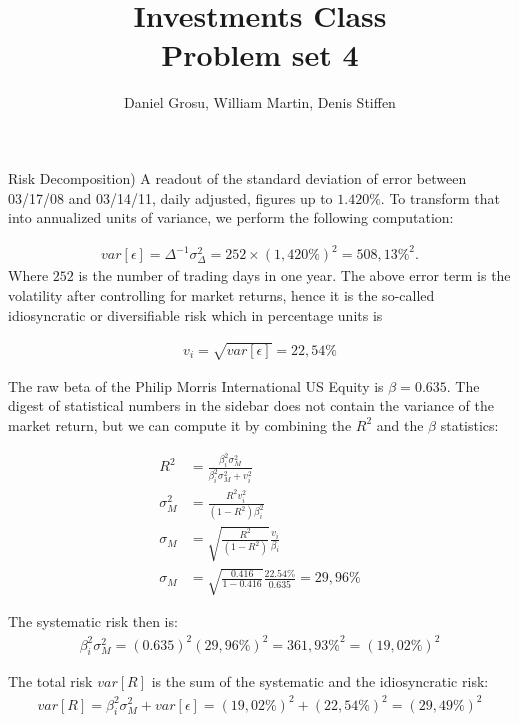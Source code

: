 \documentclass[10pt]{article}
\newenvironment{exercise}[2][Exercise]{\begin{trivlist}
  \item[\hskip \labelsep {\bfseries #1}\hskip \labelsep {\bfseries #2.}]}{\end{trivlist}}
\begin{document}
	
  \renewcommand{\qedsymbol}{\smiley}
	\title{Investments Class \\ Problem set 4}
	\author{Daniel Grosu, William Martin, Denis Stiffen}
	
	\maketitle

\begin{exercise}{1}(Risk Decomposition)
      A readout of the standard deviation of error between
      \textrm{03/17/08} and \textrm{03/14/11}, daily adjusted, figures up to
      $1.420\%$. To transform that into annualized units of variance, we perform
      the following computation:

      \begin{align*}
        var\left[ \epsilon \right] = \Delta^{-1} \sigma_{\Delta}^2 = 252 \times (1,420 \%)^2 = 508,13 \%^2.
      \end{align*}
      Where $252$ is the number of trading days in one year.
      The above error term is the volatility after controlling for market
      returns, hence it is the so-called idiosyncratic or diversifiable risk
      which in percentage units is

      \begin{align*}
        v_i = \sqrt{var\left[ \epsilon \right]} = 22,54 \%
      \end{align*}

      The raw beta of the Philip Morris International US Equity is $\beta =
      0.635$. The digest of statistical numbers in the sidebar does not contain
      the variance of the market return, but we can compute it by combining the
      $R^2$ and the $\beta$ statistics:

      \begin{align*}
        R^2 &= \frac{\beta_i^2 \sigma_M^2}{\beta_i^2 \sigma_M^2 + v_i^2} \\
        \sigma_M^2 &= \frac{R^2 v_i^2}{(1 - R^2) \beta_i^2} \\
        \sigma_M &= \sqrt{\frac{R^2}{(1 - R^2)}}\frac{v_i}{\beta_i} \\
        \sigma_M &= \sqrt{\frac{0.416}{1 - 0.416}} \frac{22.54\%}{0.635} = 29,96\%
      \end{align*}

      The systematic risk then is:
      \begin{align*}
        \beta_i^2 \sigma_M^2 = (0.635)^2(29,96\%)^2 = 361,93\%^2 = (19,02\%)^2
      \end{align*}

      The total risk $var\left[ R \right]$ is the sum of the systematic and the
      idiosyncratic risk:
      \begin{align*}
        var\left[ R \right] = \beta_i^2 \sigma_M^2 + var\left[ \epsilon \right] = (19,02\%)^2 + (22,54\%)^2 = (29,49\%)^2
      \end{align*}
\end{exercise}
\end{document}
